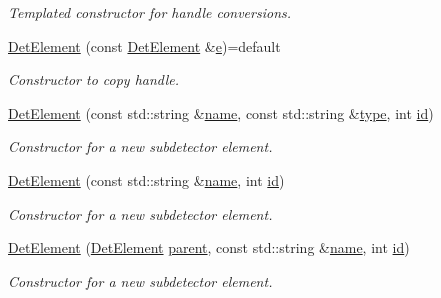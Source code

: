 \begin{DoxyCompactItemize}
\begin{DoxyCompactList}\small\item\em Templated constructor for handle conversions. \end{DoxyCompactList}\item 
\hyperlink{class_d_d4hep_1_1_geometry_1_1_det_element_a9b03f6dfc7c1884dc6a883fc7a7a6ebd}{Det\+Element} (const \hyperlink{class_d_d4hep_1_1_geometry_1_1_det_element}{Det\+Element} \&\hyperlink{_volumes_8cpp_a8a9a1f93e9b09afccaec215310e64142}{e})=default
\begin{DoxyCompactList}\small\item\em Constructor to copy handle. \end{DoxyCompactList}\item 
\hyperlink{class_d_d4hep_1_1_geometry_1_1_det_element_aaf32793c676809905450168842218f15}{Det\+Element} (const std\+::string \&\hyperlink{class_d_d4hep_1_1_handle_a27c7d467a609ab32c133e1f3c7d85ef5}{name}, const std\+::string \&\hyperlink{class_d_d4hep_1_1_geometry_1_1_det_element_a47782470bbe890c880a2824de6d1b547}{type}, int \hyperlink{class_d_d4hep_1_1_geometry_1_1_det_element_a7996df1e7f9605cb7e4ee8eae80adca3}{id})
\begin{DoxyCompactList}\small\item\em Constructor for a new subdetector element. \end{DoxyCompactList}\item 
\hyperlink{class_d_d4hep_1_1_geometry_1_1_det_element_adc0c4bb734693dc5945ed9649c4f0f9f}{Det\+Element} (const std\+::string \&\hyperlink{class_d_d4hep_1_1_handle_a27c7d467a609ab32c133e1f3c7d85ef5}{name}, int \hyperlink{class_d_d4hep_1_1_geometry_1_1_det_element_a7996df1e7f9605cb7e4ee8eae80adca3}{id})
\begin{DoxyCompactList}\small\item\em Constructor for a new subdetector element. \end{DoxyCompactList}\item 
\hyperlink{class_d_d4hep_1_1_geometry_1_1_det_element_a63af6313ed873b0596250e0a27de93d1}{Det\+Element} (\hyperlink{class_d_d4hep_1_1_geometry_1_1_det_element}{Det\+Element} \hyperlink{class_d_d4hep_1_1_geometry_1_1_det_element_ab26ab7d0bd3b8641dbfc34b84d874979}{parent}, const std\+::string \&\hyperlink{class_d_d4hep_1_1_handle_a27c7d467a609ab32c133e1f3c7d85ef5}{name}, int \hyperlink{class_d_d4hep_1_1_geometry_1_1_det_element_a7996df1e7f9605cb7e4ee8eae80adca3}{id})
\begin{DoxyCompactList}\small\item\em Constructor for a new subdetector element. \end{DoxyCompactList}\item 

\end{DoxyCompactItemize}
